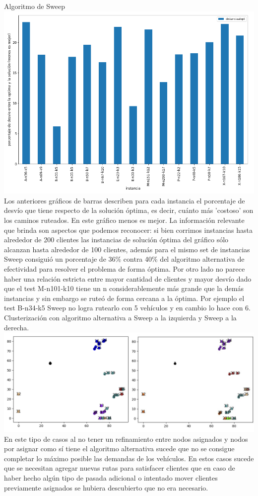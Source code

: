 \documentclass[11pt,a4paper]{article}
\begin{document}
Algoritmo de Sweep
\includegraphics[scale=.6]{graf/comparacion_clusterings.png}
\\
Los anteriores gráficos de barras describen para cada instancia el porcentaje de desvío que tiene respecto de la solución óptima, es decir, cuánto más 'costoso' son los caminos ruteados. En este gráfico menos es mejor. La información relevante que brinda son aspectos que podemos reconocer: si bien corrimos instancias hasta alrededor de 200 clientes las instancias de solución óptima del gráfico sólo alcanzan hasta alrededor de 100 clientes, además para el mismo set de instancias Sweep consiguió un porcentaje de 36\% contra 40\% del algoritmo alternativa de efectividad para resolver el problema de forma óptima. Por otro lado no parece haber una relación estricta entre mayor cantidad de clientes y mayor desvío dado que el test M-n101-k10 tiene un n considerablemente más grande que la demás instancias y sin embargo se ruteó de forma cercana a la óptima. Por ejemplo el test B-n34-k5 Sweep no logra rutearlo con 5 vehículos y en cambio lo hace con 6.\\
\bigskip
Clusterización con algoritmo alternativa a Sweep a la izquierda y Sweep a la derecha.
\includegraphics[scale=.6]{graf/clusterizacion_bn34k5}
En este tipo de casos al no tener un refinamiento entre nodos asignados y nodos por asignar como sí tiene el algoritmo alternativa sucede que no se consigue completar lo máximo posible las demandas de los vehículos. En estos casos sucede que se necesitan agregar nuevas rutas para satisfacer clientes que en caso de haber hecho algún tipo de pasada adicional o intentado mover clientes previamente asignados se hubiera descubierto que no era necesario.\\
\end{document}
